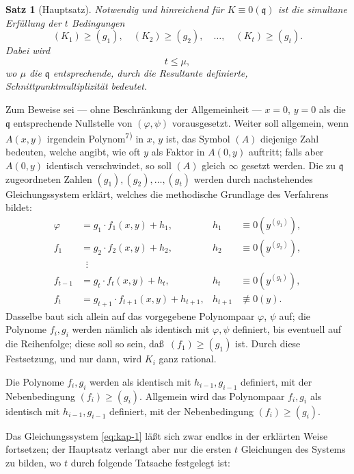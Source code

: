 \documentclass[12pt,a4paper]{article}
\theoremstyle{plain}
\newtheorem{satz}{Satz}[section]
\theoremstyle{definition}
\theoremstyle{remark}
\begin{document}
\begin{satz}[Hauptsatz]\label{satz:kap-II}
Notwendig und hinreichend f\"ur $K \equiv 0(\mathfrak{q})$ ist die simultane
Erf\"ullung der $t$ Bedingungen
\[
(K_{1}) \geq (g_{1}), \quad (K_{2}) \geq (g_{2}), \quad\ldots,\quad (K_{t}) \geq (g_{t}).
\]
Dabei wird
\[
t \leq \mu,
\]
wo $\mu$ die $\mathfrak{q}$ entsprechende, durch die Resultante definierte,
Schnittpunktmultiplizit\"at bedeutet.
\end{satz}

Zum Beweise sei --- ohne Beschr\"ankung der Allgemeinheit ---
$x = 0$, $y = 0$ als die $\mathfrak{q}$ entsprechende Nullstelle von
$(\varphi, \psi)$ vorausgesetzt. Weiter soll allgemein, wenn $A(x,y)$
irgendein Polynom\textsuperscript{7)} in $x$, $y$ ist, das Symbol $(A)$ diejenige
Zahl bedeuten, welche angibt, wie oft $y$ als Faktor in $A(0,y)$
auftritt; falls aber $A(0,y)$ identisch verschwindet, so soll $(A)$
gleich $\infty$ gesetzt werden. Die zu $\mathfrak{q}$ zugeordneten Zahlen
$(g_{1}), (g_{2}), \ldots, (g_{t})$ werden durch nachstehendes
Gleichungssystem erkl\"art, welches die methodische Grundlage des
Verfahrens bildet:
\begin{equation}\label{eq:kap-1}
\begin{aligned}
\varphi &= g_{1} \cdot f_{1}(x,y) + h_{1}, & h_{1} &\equiv 0(y^{(g_{1})}),\\
f_{1} &= g_{2} \cdot f_{2}(x,y) + h_{2}, & h_{2} &\equiv 0(y^{(g_{2})}),\\
&\;\;\vdots &&\\
f_{t-1} &= g_{t} \cdot f_{t}(x,y) + h_{t}, & h_{t} &\equiv 0(y^{(g_{t})}),\\
f_{t} &= g_{t+1} \cdot f_{t+1}(x,y) + h_{t+1}, & h_{t+1} &\not\equiv 0(y).
\end{aligned}
\end{equation}
Dasselbe baut sich allein auf das vorgegebene Polynompaar
$\varphi$, $\psi$ auf; die Polynome $f_{i}, g_{i}$ werden n\"amlich als
identisch mit $\varphi, \psi$ definiert, bis eventuell auf die
Reihenfolge; diese soll so sein, da\ss\ $(f_{1}) \geq (g_{1})$ ist. Durch
diese Festsetzung, und nur dann, wird $K_{i}$ ganz rational.

Die Polynome $f_{i}, g_{i}$ werden als identisch mit $h_{i-1}, g_{i-1}$
definiert, mit der Nebenbedingung $(f_{i}) \geq (g_{i})$. Allgemein wird
das Polynompaar $f_{i}, g_{i}$ als identisch mit $h_{i-1}, g_{i-1}$
definiert, mit der Nebenbedingung $(f_{i}) \geq (g_{i})$.

Das Gleichungssystem \eqref{eq:kap-1} l\"a\ss t sich zwar endlos in der
erkl\"arten Weise fortsetzen; der Hauptsatz verlangt aber nur die
ersten $t$ Gleichungen des Systems zu bilden, wo $t$ durch folgende
Tatsache festgelegt ist:
\end{document}
